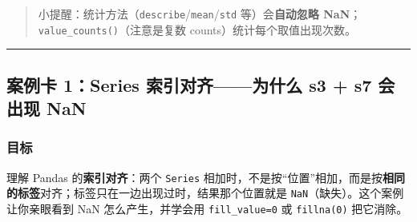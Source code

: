 \begin{Shaded}
\begin{Highlighting}[]
\NormalTok{[100   2   3   4   5]}
\end{Highlighting}
\end{Shaded}

\begin{quote}
小提醒：统计方法（\texttt{describe}/\texttt{mean}/\texttt{std}
等）会\textbf{自动忽略 NaN}；\texttt{value\_counts()}（注意是复数
counts）统计每个取值出现次数。
\end{quote}

\begin{center}\rule{0.5\linewidth}{0.5pt}\end{center}

\subsection{案例卡 1：Series 索引对齐------为什么 s3 + s7 会出现
NaN}\label{ux6848ux4f8bux5361-1series-ux7d22ux5f15ux5bf9ux9f50ux4e3aux4ec0ux4e48-s3-s7-ux4f1aux51faux73b0-nan}

\subsubsection{目标}\label{ux76eeux6807-17}

理解 Pandas 的\textbf{索引对齐}：两个 \texttt{Series}
相加时，不是按``位置''相加，而是按\textbf{相同的标签}对齐；标签只在一边出现过时，结果那个位置就是
\texttt{NaN}（缺失）。这个案例让你亲眼看到 NaN 怎么产生，并学会用
\texttt{fill\_value=0} 或 \texttt{fillna(0)} 把它消除。

